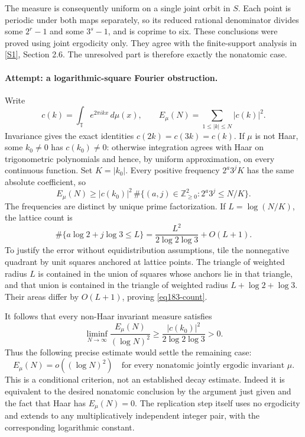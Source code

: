 \documentclass[11pt,a4paper]{article}
\newcommand{\Z}{\mathbb{Z}}
\newcommand{\sref}[2]{\hyperlink{source:#1:#2}{[S#2]}}
\numberwithin{equation}{section}
\begin{document}
The measure is consequently uniform on a single joint orbit in $S$. Each
point is periodic under both maps separately, so its reduced rational
denominator divides some $2^r-1$ and some $3^s-1$, and is coprime to six.
These conclusions were proved using joint ergodicity only. They agree
with the finite-support analysis in \sref{183}{1}, Section 2.6. The
unresolved part is therefore exactly the nonatomic case.

\paragraph{Attempt: a logarithmic-square Fourier obstruction.}
Write
\[
 c(k)=\int_{\mathbb T}e^{2\pi ikx}\,d\mu(x),\qquad
 E_\mu(N)=\sum_{1\le |k|\le N}|c(k)|^2.
\]
Invariance gives the exact identities $c(2k)=c(3k)=c(k)$. If $\mu$ is not
Haar, some $k_0\ne0$ has $c(k_0)\ne0$: otherwise integration agrees with
Haar on trigonometric polynomials and hence, by uniform approximation,
on every continuous function. Set $K=|k_0|$. Every positive frequency $2^a3^jK$ has the same
absolute coefficient, so
\[
 E_\mu(N)\ge |c(k_0)|^2\,
       \#\{(a,j)\in\Z_{\ge0}^2:2^a3^j\le N/K\}.
\]
The frequencies are distinct by unique prime factorization. If
$L=\log(N/K)$, the lattice count is
\begin{equation}\label{eq183-count}
 \#\{a\log2+j\log3\le L\}
       =\frac{L^2}{2\log2\log3}+O(L+1).
\end{equation}
To justify the error without equidistribution assumptions, tile the
nonnegative quadrant by unit squares anchored at lattice points. The
triangle of weighted radius $L$ is contained in the union of squares
whose anchors lie in that triangle, and that union is contained in the
triangle of weighted radius $L+\log2+\log3$. Their areas differ by
$O(L+1)$, proving \eqref{eq183-count}.

It follows that every non-Haar invariant measure satisfies
\begin{equation}\label{eq183-lower}
 \liminf_{N\to\infty}\frac{E_\mu(N)}{(\log N)^2}
                 \ge\frac{|c(k_0)|^2}{2\log2\log3}>0.
\end{equation}
Thus the following precise estimate would settle the remaining case:
\begin{equation}\label{eq183-missing}
 E_\mu(N)=o((\log N)^2)
 \quad\text{for every nonatomic jointly ergodic invariant }\mu.
\end{equation}
This is a conditional criterion, not an established decay estimate.
Indeed it is equivalent to the desired nonatomic conclusion by the
argument just given and the fact that Haar has $E_\mu(N)=0$. The replication step
itself uses no ergodicity and extends to any multiplicatively independent
integer pair, with the corresponding logarithmic constant.
\end{document}
